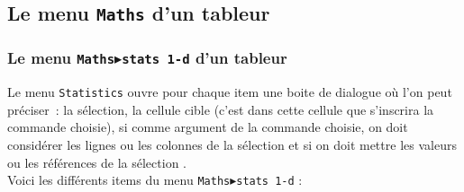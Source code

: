 \documentclass[a4paper,11pt]{book}
\begin{document}
\subsection{Le menu {\tt Maths} d'un tableur}
\subsubsection{Le menu {\tt Maths$\blacktriangleright$stats 1-d} d'un tableur}
Le menu {\tt Statistics} ouvre pour chaque item une boite de dialogue o\`u l'on
peut pr\'eciser~: la s\'election, la cellule cible (c'est dans cette cellule 
que s'inscrira la commande choisie), si comme argument de la commande
choisie, on doit consid\'erer les lignes ou les colonnes de la  s\'election et 
si on doit mettre les valeurs ou les r\'ef\'erences de la  s\'election .\\
Voici les diff\'erents items du menu 
{\tt Maths$\blacktriangleright$stats 1-d} :
\end{document}
